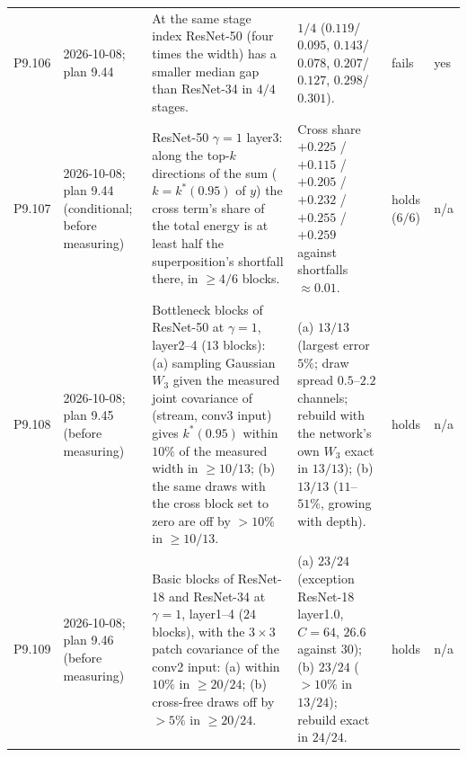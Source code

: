 \begin{longtable}{p{1.1cm}p{1.4cm}p{6.2cm}p{4.6cm}p{2.0cm}p{1.6cm}}
P9.106 & 2026-10-08; plan 9.44 & At the same stage index ResNet-50 (four times the width) has a smaller median gap than ResNet-34 in $4/4$ stages. & $1/4$ ($0.119$/$0.095$, $0.143$/$0.078$, $0.207$/$0.127$, $0.298$/$0.301$). & fails & yes \\
P9.107 & 2026-10-08; plan 9.44 (conditional; before measuring) & ResNet-50 $\gamma = 1$ layer3: along the top-$k$ directions of the sum ($k = k^*(0.95)$ of $y$) the cross term's share of the total energy is at least half the superposition's shortfall there, in $\ge 4/6$ blocks. & Cross share $+0.225$ / $+0.115$ / $+0.205$ / $+0.232$ / $+0.255$ / $+0.259$ against shortfalls $\approx 0.01$. & holds ($6/6$) & n/a \\
P9.108 & 2026-10-08; plan 9.45 (before measuring) & Bottleneck blocks of ResNet-50 at $\gamma = 1$, layer2--4 ($13$ blocks): (a) sampling Gaussian $W_3$ given the measured joint covariance of (stream, conv3 input) gives $k^*(0.95)$ within $10\%$ of the measured width in $\ge 10/13$; (b) the same draws with the cross block set to zero are off by $> 10\%$ in $\ge 10/13$. & (a) $13/13$ (largest error $5\%$; draw spread $0.5$--$2.2$ channels; rebuild with the network's own $W_3$ exact in $13/13$); (b) $13/13$ ($11$--$51\%$, growing with depth). & holds & n/a \\
P9.109 & 2026-10-08; plan 9.46 (before measuring) & Basic blocks of ResNet-18 and ResNet-34 at $\gamma = 1$, layer1--4 ($24$ blocks), with the $3\times3$ patch covariance of the conv2 input: (a) within $10\%$ in $\ge 20/24$; (b) cross-free draws off by $> 5\%$ in $\ge 20/24$. & (a) $23/24$ (exception ResNet-18 layer1.0, $C = 64$, $26.6$ against $30$); (b) $23/24$ ($> 10\%$ in $13/24$); rebuild exact in $24/24$. & holds & n/a \\
\bottomrule
\end{longtable}
